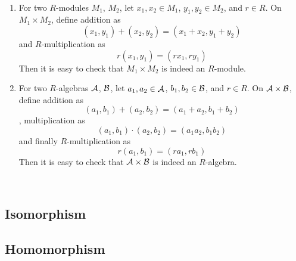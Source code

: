 \\
\begin{enumerate}
	\item For two $R$-modules $M_1$, $M_2$, let $x_1, x_2\in M_1$, $y_1, y_2\in M_2$, and $r\in R$. On $M_1\times M_2$, define addition as
	$$(x_1, y_1) + (x_2, y_2) = (x_1+x_2, y_1+y_2)$$
	and $R$-multiplication as
	$$r(x_1, y_1) = (rx_1, ry_1)$$
	Then it is easy to check that $M_1\times M_2$ is indeed an $R$-module.
	\item For two $R$-algebras $\mathcal{A}$, $\mathcal{B}$, let $a_1, a_2\in \mathcal{A}$, $b_1, b_2\in \mathcal{B}$, and $r\in R$. On $\mathcal{A}\times \mathcal{B}$, define addition as
	$$(a_1, b_1) + (a_2, b_2) = (a_1+a_2, b_1+b_2)$$
	, multiplication as
	$$(a_1, b_1)\cdot(a_2, b_2) = (a_1a_2, b_1b_2)$$
	and finally $R$-multiplication as
	$$r(a_1, b_1) = (ra_1, rb_1)$$
	Then it is easy to check that $\mathcal{A}\times\mathcal{B}$ is indeed an $R$-algebra.
\end{enumerate}~
\\

\subsection{Isomorphism}

\subsection{Homomorphism}